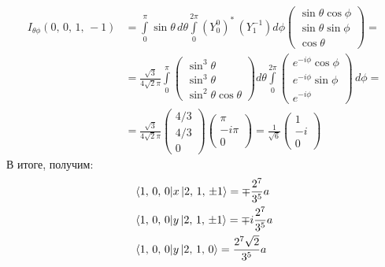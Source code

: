 \begin{align*}
    I_{\theta\phi}(0,\,0,\,1,\,-1) &= \int\limits_{0}^{\pi}\sin\theta\,d\theta\int\limits_{0}^{2\pi}(Y^0_0)^* \, (Y^{-1}_1) d\phi \begin{pmatrix} \sin\theta\cos\phi \\ \sin\theta\sin\phi \\ \cos\theta \end{pmatrix} = \\& = \frac{\sqrt{3}}{4\sqrt{2}\pi} \int\limits_0^{\pi} \begin{pmatrix} \sin^3 \theta \\ \sin^3\theta \\ \sin^2\theta\cos\theta \end{pmatrix} d\theta \int\limits_{0}^{2\pi} \begin{pmatrix} e^{-i\phi}\cos\phi \\ e^{-i\phi}\sin\phi \\ e^{-i\phi} \end{pmatrix} \, d\phi = \\& = \frac{\sqrt{3}}{4\sqrt{2}\pi} \begin{pmatrix} 4/3 \\ 4/3 \\ 0 \end{pmatrix} \begin{pmatrix} \pi \\ -i\pi \\ 0 \end{pmatrix} = \frac{1}{\sqrt{6}} \begin{pmatrix} 1 \\ -i \\ 0 \end{pmatrix}
\end{align*}
В итоге, получим:
\begin{align*}
 \bra{1,\, 0,\, 0}&x\ket{2,\, 1,\, \pm 1} = \mp \frac{2^7}{3^5}a\\
 \bra{1,\, 0,\, 0}&y\ket{2,\, 1,\, \pm 1} = \mp i\frac{2^7}{3^5}a\\
 \bra{1,\, 0,\, 0}&y\ket{2,\, 1,\,  0} = \frac{2^7 \sqrt{2}}{3^5}a
\end{align*}
